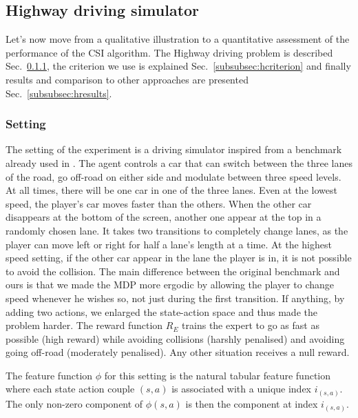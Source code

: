 \documentclass[smallextended]{svjour3}
\begin{document}
\subsection{Highway driving simulator}
\label{subsec:highway}
Let's now move from a qualitative illustration to a quantitative assessment of the performance of the CSI algorithm. The Highway driving problem is described Sec.~\ref{subsubsec:hsetting}, the criterion we use is explained Sec.~\ref{subsubsec:hcriterion} and finally results and comparison to other approaches are presented Sec.~\ref{subsubsec:hresults}.
\subsubsection{Setting}
\label{subsubsec:hsetting}
The setting of the experiment is a driving simulator inspired from a benchmark already used in \cite{syed2008apprenticeship,syed2008game}. The agent controls a car that can switch between the three lanes of the road, go off-road on either side and modulate between three speed levels. At all times, there will be one car in one of the three lanes. Even at the lowest speed, the player's car moves faster than the others. When the other car disappears at the bottom of the screen, another one appear at the top in a randomly chosen lane. It takes two transitions to completely change lanes, as the player can move left or right for half a lane's length at a time. At the highest speed setting, if the other car appear in the lane the player is in, it is not possible to avoid the collision. The main difference between the original benchmark \cite{syed2008apprenticeship,syed2008game} and ours is that we made the MDP more ergodic by allowing the player to change speed whenever he wishes so, not just during the first transition. If anything, by adding two actions, we enlarged the state-action space and thus made the problem harder.
The reward function $R_E$ trains the expert to go as fast as possible (high reward) while avoiding collisions (harshly penalised) and avoiding going off-road (moderately penalised). Any other situation receives a null reward.

The feature function $\phi$ for this setting is the natural tabular feature function where each state action couple $(s,a)$ is associated with a unique index $i_{(s,a)}$. The only non-zero component of $\phi(s,a)$ is then the component at index $i_{(s,a)}$.
\end{document}
